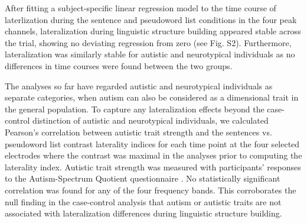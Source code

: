 After fitting a subject-specific linear regression model to the time course of laterlization during the sentence and pseudoword list conditions in the four peak channels, lateralization during linguistic structure building appeared stable across the trial, showing no deviating regression from zero (see Fig. S2). Furthermore, lateralization was similarly stable for autistic and neurotypical individuals as no differences in time courses were found between the two groups. 

The analyses so far have regarded autistic and neurotypical individuals as separate categories, when autism can also be considered as a dimensional trait in the general population. To capture any lateralization effects beyond the case-control distinction of autistic and neurotypical individuals, we calculated Pearson's correlation between autistic trait strength and the sentences vs. pseudoword list contrast laterality indices for each time point at the four selected electrodes where the contrast was maximal in the analyses prior to computing the laterality index. Autistic trait strength was measured with participants' responses to the Autism-Spectrum Quotient questionnaire \citep[AQ][]{baron-cohen2001AQ}. No statistically significant correlation was found for any of the four frequency bands. This corroborates the null finding in the case-control analysis that autism or autistic traits are not associated with lateralization differences during linguistic structure building. 

